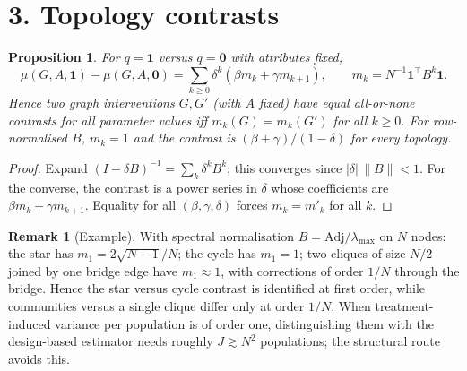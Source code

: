 \documentclass[11pt]{article}
\newtheorem{proposition}[theorem]{Proposition}
\theoremstyle{definition}
\newtheorem{remark}[theorem]{Remark}
\begin{document}
\section*{3. Topology contrasts}
\begin{proposition}\label{prop:walk}
For $q=\mathbf 1$ versus $q=\mathbf 0$ with attributes fixed,
\[
 \mu(G,A,\mathbf 1)-\mu(G,A,\mathbf 0)=\sum_{k\ge0}\delta^k(\beta m_k+\gamma m_{k+1}),\qquad m_k=N^{-1}\mathbf 1^\top B^k\mathbf 1.
\]
Hence two graph interventions $G,G'$ (with $A$ fixed) have equal all-or-none contrasts for all parameter values iff
$m_k(G)=m_k(G')$ for all $k\ge0$. For row-normalised $B$, $m_k=1$ and the contrast is $(\beta+\gamma)/(1-\delta)$ for every
topology.
\end{proposition}
\begin{proof}
Expand $(I-\delta B)^{-1}=\sum_k\delta^kB^k$; this converges since $|\delta|\,\|B\|<1$. For the converse, the contrast is a
power series in $\delta$ whose coefficients are $\beta m_k+\gamma m_{k+1}$. Equality for all $(\beta,\gamma,\delta)$
forces $m_k=m'_k$ for all $k$.
\end{proof}
\begin{remark}[Example]
With spectral normalisation $B=\mathrm{Adj}/\lambda_{\max}$ on $N$ nodes: the star has $m_1=2\sqrt{N-1}/N$; the cycle has
$m_1=1$; two cliques of size $N/2$ joined by one bridge edge have $m_1\approx1$, with corrections of order $1/N$ through the
bridge. Hence the star versus cycle contrast is identified at first order, while communities versus a single clique differ
only at order $1/N$. When treatment-induced variance per population is of order one, distinguishing them with the
design-based estimator needs roughly $J\gtrsim N^2$ populations; the structural route avoids this.
\end{remark}
\end{document}
